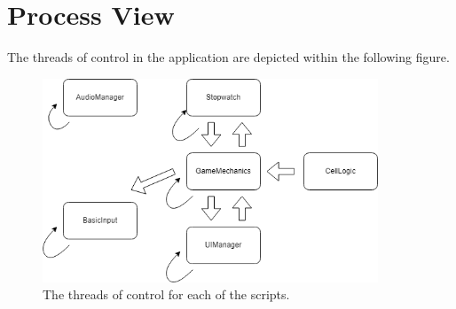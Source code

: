 \section{Process View}
\label{sec:ProcessView}

The threads of control in the application are depicted within the following figure.

\begin{figure}[htb]
    \centering
    \includegraphics[width=10cm]{Images/ProcessView.png}
       \caption{The threads of control for each of the scripts.}
           \label{Fig:ProcessView}
  \end{figure}